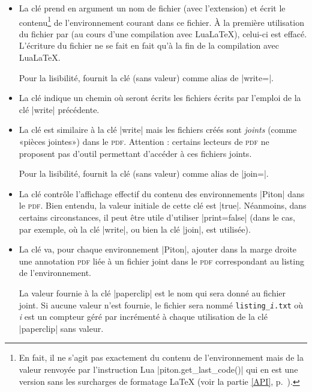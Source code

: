 \documentclass[dvipsnames,svgnames]{article}
\begin{document}
\begin{itemize}
\item {} La clé  prend en argument un nom de
fichier (avec l'extension) et écrit le contenu\footnote{En fait, il ne s'agit
  pas exactement du contenu de l'environnement mais de la valeur renvoyée par
  l'instruction Lua |piton.get_last_code()| qui en est une version sans les
  surcharges de formatage LaTeX (voir la partie \ref{API}, p.~\pageref{API}).}
de l'environnement courant dans ce fichier. À la première utilisation du fichier
par  (au cours d'une compilation avec LuaLaTeX), celui-ci est effacé.
L'écriture du fichier ne se fait en fait qu'à la fin de la compilation avec LuaLaTeX.

Pour la lisibilité,  fournit la clé  (sans valeur) comme
alias de |write=|.

\item {} La clé  indique un chemin où
seront écrits les fichiers écrits par l'emploi de la clé |write| précédente.

\item {} 
La clé  est similaire à la clé |write| mais les fichiers créés sont
\emph{joints} (comme «pièces jointes») dans le \textsc{pdf}. Attention :
certains lecteurs de \textsc{pdf} ne proposent pas d'outil permettant d'accéder à
ces fichiers joints.


Pour la lisibilité,  fournit la clé  (sans valeur) comme
alias de |join=|.


\item {}
La clé  contrôle l'affichage effectif du contenu des
environnements |{Piton}| dans le \textsc{pdf}. Bien entendu, la valeur initiale de cette
clé est |true|. Néanmoins, dans certains circonstances, il peut être utile
d'utiliser |print=false| (dans le cas, par exemple, où la clé |write|, ou bien
la clé |join|, est utilisée).

\item {}
La clé  va, pour chaque environnement |{Piton}|, ajouter dans la marge
droite une annotation \textsc{pdf} liée à un fichier joint dans le \textsc{pdf} correspondant
au listing de l'environnement.

La valeur fournie à la clé |paperclip| est le nom qui sera donné au fichier joint. Si aucune
valeur n'est fournie, le fichier sera nommé \texttt{listing_\textsl{i}.txt} où \textsl{i}
est un compteur géré par  incrémenté à chaque utilisation de la clé |paperclip|
sans valeur.


\end{itemize}
\end{document}
